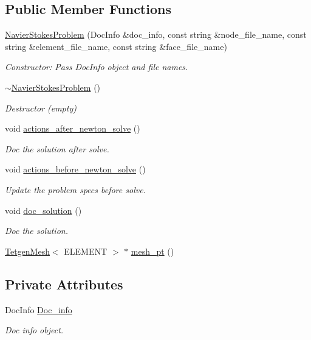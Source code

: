 \subsection*{Public Member Functions}
\begin{DoxyCompactItemize}
\item 
\hyperlink{classNavierStokesProblem_a46835b845a017b66b7cbb45dad10bd17}{Navier\+Stokes\+Problem} (Doc\+Info \&doc\+\_\+info, const string \&node\+\_\+file\+\_\+name, const string \&element\+\_\+file\+\_\+name, const string \&face\+\_\+file\+\_\+name)
\begin{DoxyCompactList}\small\item\em Constructor\+: Pass Doc\+Info object and file names. \end{DoxyCompactList}\item 
\hyperlink{classNavierStokesProblem_ac519026cc9a3ad11a1a0b702a96aa9ee}{$\sim$\+Navier\+Stokes\+Problem} ()
\begin{DoxyCompactList}\small\item\em Destructor (empty) \end{DoxyCompactList}\item 
void \hyperlink{classNavierStokesProblem_aaf0ba897bf867aeb91dd557a577cb391}{actions\+\_\+after\+\_\+newton\+\_\+solve} ()
\begin{DoxyCompactList}\small\item\em Doc the solution after solve. \end{DoxyCompactList}\item 
void \hyperlink{classNavierStokesProblem_a61feda03c9972cae62cfa1c3486bf17a}{actions\+\_\+before\+\_\+newton\+\_\+solve} ()
\begin{DoxyCompactList}\small\item\em Update the problem specs before solve. \end{DoxyCompactList}\item 
void \hyperlink{classNavierStokesProblem_a220db7388319f4215b54459d32ba784b}{doc\+\_\+solution} ()
\begin{DoxyCompactList}\small\item\em Doc the solution. \end{DoxyCompactList}\item 
\hyperlink{classoomph_1_1TetgenMesh}{Tetgen\+Mesh}$<$ E\+L\+E\+M\+E\+NT $>$ $\ast$ \hyperlink{classNavierStokesProblem_a1d69e5e56711b1132e23b569679f04f6}{mesh\+\_\+pt} ()
\end{DoxyCompactItemize}
\subsection*{Private Attributes}
\begin{DoxyCompactItemize}
\item 
Doc\+Info \hyperlink{classNavierStokesProblem_af77a241c0eb484c1669b538286d22e18}{Doc\+\_\+info}
\begin{DoxyCompactList}\small\item\em Doc info object. \end{DoxyCompactList}\end{DoxyCompactItemize}


